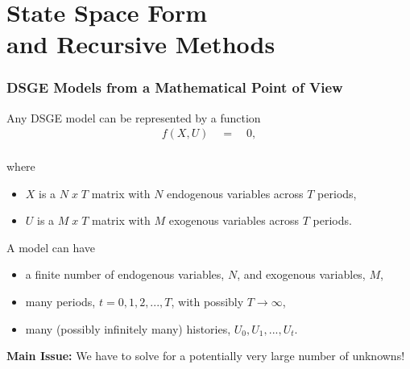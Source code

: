 \documentclass[10pt,c,aspectratio=1610,handout]{beamer}
\begin{document}
\section{State Space Form\\and Recursive Methods}%
\begin{frame}%
  \frametitle{DSGE Models from a Mathematical Point of View}%
  Any DSGE model can be represented by a function%
  \begin{align*}%
    f \left(X, U\right) \quad = \quad 0,%
  \end{align*}\\%
  \vspace*{-0.1in}%
  where %
  \begin{itemize}%
    \item[$\blacktriangleright$] $X$ is a $N\;x\;T$ matrix with $N$ endogenous variables across $T$ periods,%
    \item[$\blacktriangleright$] $U$ is a $M\;x\;T$ matrix with $M$ exogenous variables across $T$ periods.%
  \end{itemize}%
  \pause%
  A model can have%
  \begin{itemize}%
    \item[$\blacktriangleright$] a finite number of endogenous variables, $N$, and exogenous variables, $M$,%
    \item[$\blacktriangleright$] many periods, $t = 0,1,2, ..., T$, with possibly $T \rightarrow \infty$,%
    \item[$\blacktriangleright$] many (possibly infinitely many) histories, $U_0, U_1, ..., U_t$.%
  \end{itemize}%
  \vspace*{0.1in}%
  \pause%
  \textbf{Main Issue:} We have to solve for a potentially very large number of unknowns!%
\end{frame}%
\end{document}
